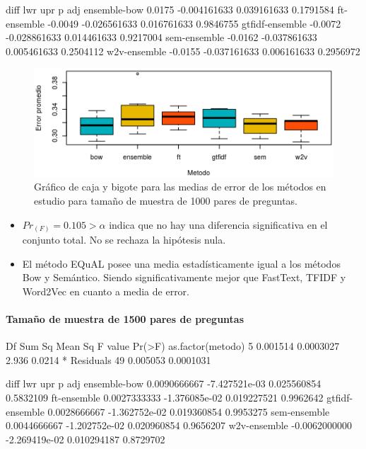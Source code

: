\begin{rc}
                  diff          lwr         upr     p adj
ensemble-bow     0.0175 -0.004161633 0.039161633 0.1791584
ft-ensemble     -0.0049 -0.026561633 0.016761633 0.9846755
gtfidf-ensemble -0.0072 -0.028861633 0.014461633 0.9217004
sem-ensemble    -0.0162 -0.037861633 0.005461633 0.2504112
w2v-ensemble    -0.0155 -0.037161633 0.006161633 0.2956972
\end{rc}

\begin{figure}
	\centering
	\includegraphics[width=0.7\linewidth]{10_resultados/imagenes/anova_1000}
	\caption{Gráfico de caja y bigote para las medias de error de los métodos en estudio para tamaño de muestra de 1000 pares de preguntas.}
	\label{fig:anova1000}
\end{figure}

\begin{itemize}
	\item \(Pr_(F) = 0.105 > \alpha\) indica que no hay una diferencia significativa en el conjunto total. No se rechaza la hipótesis nula.
	\item El método EQuAL posee una media estadísticamente igual a los métodos Bow y Semántico. Siendo significativamente mejor que FastText, TFIDF y Word2Vec en cuanto a media de error.
\end{itemize}

\paragraph{Tamaño de muestra de 1500 pares de preguntas}

\begin{rc}
                 Df   Sum Sq   Mean Sq F value Pr(>F)
as.factor(metodo)  5 0.001514 0.0003027   2.936 0.0214 *
Residuals         49 0.005053 0.0001031
\end{rc}

\begin{rc}
                        diff           lwr         upr     p adj
ensemble-bow     0.0090666667 -7.427521e-03 0.025560854 0.5832109
ft-ensemble      0.0027333333 -1.376085e-02 0.019227521 0.9962642
gtfidf-ensemble  0.0028666667 -1.362752e-02 0.019360854 0.9953275
sem-ensemble     0.0044666667 -1.202752e-02 0.020960854 0.9656207
w2v-ensemble    -0.0062000000 -2.269419e-02 0.010294187 0.8729702
\end{rc}

